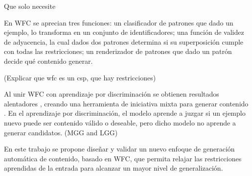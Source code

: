 Que solo necesite 

En WFC se aprecian tres funciones: un clasificador de patrones 
que dado un ejemplo, lo transforma en un conjunto de identificadores;
una función de validez de adyacencia, la cual dados dos patrones determina
si su superposición cumple con todas las restricciones; un 
renderizador de patrones que dado un patrón decide qué contenido generar.

(Explicar que wfc es un csp, que hay restricciones)

Al unir WFC con aprendizaje por discriminación \cite{bib:12} se obtienen resultados
alentadores \cite{bib:3}, creando una herramienta de iniciativa mixta 
para generar contenido \cite{bib:4}. En el aprendizaje por 
discriminación, el modelo aprende a juzgar si un ejemplo nuevo
puede ser contenido válido o deseable, pero dicho modelo no aprende
a generar candidatos. (MGG and LGG)

En este trabajo se propone diseñar y validar un nuevo enfoque de generación
automática de contenido, basado en WFC, que permita relajar las restricciones 
aprendidas de la entrada para alcanzar un mayor nivel de generalización.



